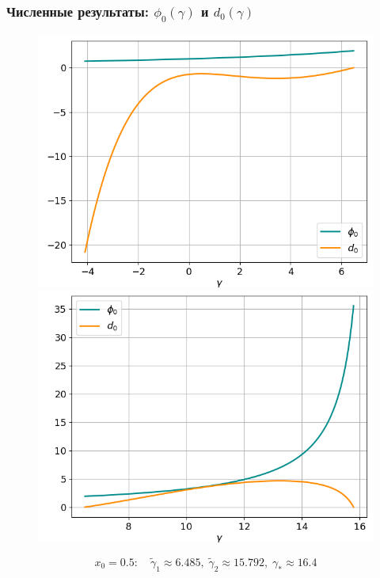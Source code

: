\documentclass[fullscreen=true, unicode, bookmarks=false]{beamer}
\begin{document}
\begin{frame}
\frametitle{ Численные результаты: $ \phi_0(\gamma) $ и $ d_0(\gamma) $ }

\begin{figure} 
\includegraphics[scale=0.33]{divergent_phi0d0_12_1.png}  
\hfill
\includegraphics[scale=0.33]{divergent_phi0d0_12_2.png}  
\end{figure}

$$ x_0 = 0.5: \quad \tilde{\gamma}_1 \approx 6.485, \; \tilde{\gamma}_2 \approx 15.792, \; \gamma_* \approx 16.4 $$

\end{frame}
\end{document}
